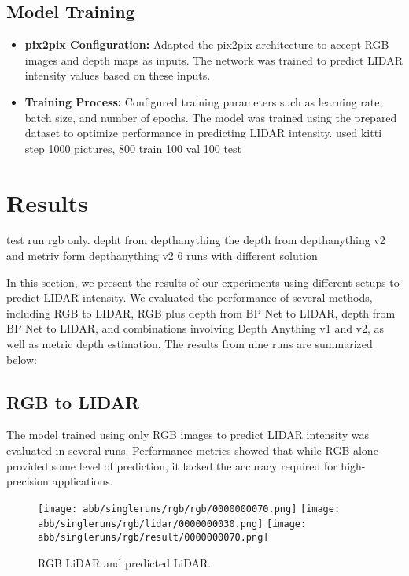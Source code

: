 \subsection{Model Training}
\begin{itemize}
	\item \textbf{pix2pix Configuration:} Adapted the pix2pix architecture to accept RGB images and depth maps as inputs. The network was trained to predict LIDAR intensity values based on these inputs.
	\item \textbf{Training Process:} Configured training parameters such as learning rate, batch size, and number of epochs. The model was trained using the prepared dataset to optimize performance in predicting LIDAR intensity.
	used kitti step 1000 pictures, 800 train 100 val 100 test
\end{itemize}
\section{Results} \label{results}
test run rgb only. depht from depthanything the depth from depthanything v2 and metriv form depthanything v2 6 runs with different solution

In this section, we present the results of our experiments using different setups to predict LIDAR intensity. We evaluated the performance of several methods, including RGB to LIDAR, RGB plus depth from BP Net to LIDAR, depth from BP Net to LIDAR, and combinations involving Depth Anything v1 and v2, as well as metric depth estimation. The results from nine runs are summarized below:

\subsection{RGB to LIDAR}

The model trained using only RGB images to predict LIDAR intensity was evaluated in several runs. Performance metrics showed that while RGB alone provided some level of prediction, it lacked the accuracy required for high-precision applications.
\begin{figure}[!ht]
	\centering
	\texttt{[image: abb/singleruns/rgb/rgb/0000000070.png]}
	\texttt{[image: abb/singleruns/rgb/lidar/0000000030.png]}
	\texttt{[image: abb/singleruns/rgb/result/0000000070.png]}
	\caption{RGB LiDAR and predicted LiDAR.}
	\label{depth}
\end{figure}


